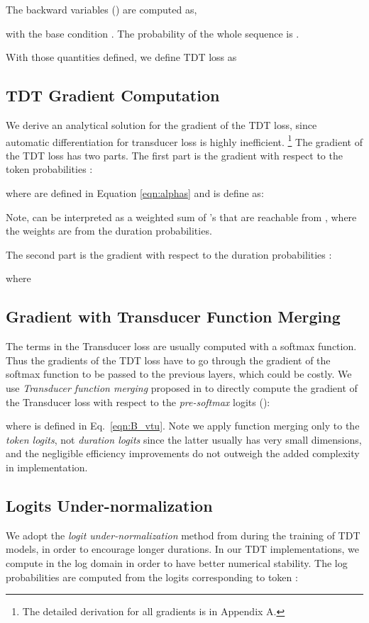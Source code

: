 \documentclass{article}
\begin{document}
The backward variables () are computed as,

with the base condition . 
The probability of the whole sequence is . 


With those quantities defined, we define TDT loss as



\subsection{TDT Gradient Computation} \label{gradient}

We derive an analytical solution for the gradient of the TDT loss, since automatic differentiation  for transducer loss is highly inefficient.
\footnote{The detailed derivation for all gradients is in Appendix A.} The gradient of the TDT loss  has two parts. 
The first part is the gradient with respect to the token probabilities : 

where  are defined in Equation \ref{eqn:alphas} and  is define as:


Note,  can be interpreted as a weighted sum of  's that are reachable from , where the weights are from the duration probabilities.

The second part is the  gradient with respect to the duration probabilities :

where


\subsection{Gradient  with Transducer  Function Merging}
The  terms in the Transducer loss are usually computed with a softmax function. Thus the gradients of the TDT loss have to go through the gradient of the softmax function to be passed to the previous layers, which could be costly.
We use \emph{Transducer function merging}  proposed in \cite{li2019improving} to directly compute the gradient of the Transducer loss with respect to the \emph{pre-softmax} logits ():

where  is defined in Eq.~\ref{eqn:B_vtu}.
Note we apply function merging only to the \emph{token logits}, not \emph{duration logits} since the latter  usually has very small dimensions, and the negligible efficiency improvements do not outweigh the added complexity in implementation.


\subsection{Logits Under-normalization} \label{sec:under_norm}
We adopt the \emph{logit under-normalization} method from \cite{xu2022multi} during the training of  TDT models, in order to encourage longer durations. 
In our TDT implementations, we compute   in the log domain in order to have better numerical stability. The log probabilities  are computed from the logits   corresponding to token :
\end{document}
